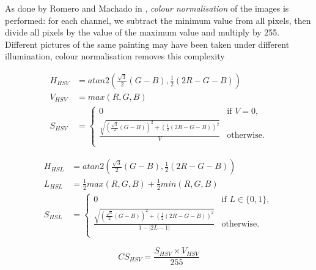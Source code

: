 \documentclass[11pt,a4paper,twoside,openright]{report}
\begin{document}
As done by Romero and Machado in  \cite{jma12clas}, \emph{colour normalisation}
of the images is performed: for each channel, we subtract the minimum value
from all pixels, then divide all pixels by the value of the maximum value and
multiply by 255.  Different pictures of the same painting may have been taken
under different illumination, colour normalisation removes this complexity

\begin{figure}[!htb]
\begin{equation}
\begin{aligned}
H_{HSV}  &= atan2\left(\frac{\sqrt{3}}{2}(G-B), \frac{1}{2}(2R-G-B)\right) \\
V_{HSV}  &= max(R,G,B) \\
S_{HSV}  &= \left\{
  \begin{array}{ll}
    0  &  \text{if } V = 0, \\
    \frac{\sqrt{ \left(\frac{\sqrt{3}}{2}(G-B)\right)^2
               + \left(\frac{1}{2}(2R-G-B)\right)^2 }}{V}
  &  \text{otherwise}. \\
  \end{array}
            \right.
\label{eq:hsv}
\end{aligned}
\end{equation}
\end{figure}

\begin{figure}[!htb]
\begin{equation}
\begin{aligned}
H_{HSL}  &= atan2\left(\frac{\sqrt{3}}{2}(G-B), \frac{1}{2}(2R-G-B)\right) \\
L_{HSL}  &= \frac{1}{2}max(R,G,B) + \frac{1}{2}min(R,G,B) \\
S_{HSL}  &= \left\{
  \begin{array}{ll}
    0  &  \text{if } L \in \{0,1\}, \\
    \frac{\sqrt{ \left(\frac{\sqrt{3}}{2}(G-B)\right)^2
               + \left(\frac{1}{2}(2R-G-B)\right)^2 }}{1 - \lvert 2L-1 \rvert}
  &  \text{otherwise}. \\
  \end{array}
           \right.
\label{eq:hsl}
\end{aligned}
\end{equation}
\end{figure}

\begin{equation}
CS_{HSV} = \frac{S_{HSV} \times V_{HSV}}{255}
\label{eq:cs}
\end{equation}
\end{document}
